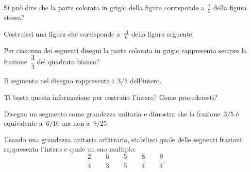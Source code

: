 \begin{esercizio}
 \label{ese:3.11}
Si può dire che la parte colorata in grigio della figura corrisponde 
a~$\frac{1}{5}$ della figura stessa?
\end{esercizio}

\begin{esercizio}
 \label{ese:3.12}
Costruisci una figura che corrisponde a~$\frac{11}{6}$ della figura seguente.
\end{esercizio}

\begin{esercizio}
 \label{ese:3.13}
Per ciascuno dei seguenti disegni la parte colorata in grigio rappresenta 
sempre la frazione~$\dfrac{3}{4}$ del quadrato bianco?
 \begin{center}
 
 \end{center}
\end{esercizio}

\begin{esercizio}
 \label{ese:3.14}
Il segmento nel disegno rappresenta i~$3/5$ dell'intero.
 \begin{center}
 
 \end{center}
Ti basta questa informazione per costruire l'intero? Come procederesti?
\end{esercizio}

\begin{esercizio}
 \label{ese:3.15}
Disegna un segmento come grandezza unitaria e dimostra che la frazione~$3/5$ 
è equivalente a~$6/10$ ma non a~$9/25$
% 
\end{esercizio}

\begin{esercizio}
 \label{ese:3.16}
Usando una grandezza unitaria arbitraria, stabilisci quale delle seguenti 
frazioni rappresenta l'intero e quale un suo multiplo:
\[\dfrac{2}{4}\qquad\dfrac{6}{3}\qquad\dfrac{5}{5}\qquad\dfrac{8}{4}\qquad
\dfrac{9}{4}.\]
\end{esercizio}

